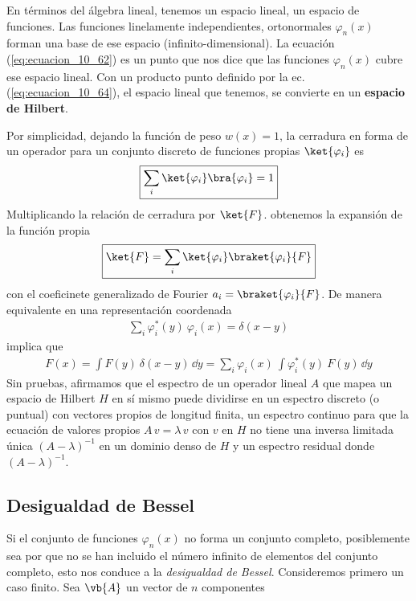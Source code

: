 \par
En términos del álgebra lineal, tenemos un espacio lineal, un espacio de funciones. Las funciones linelamente independientes, ortonormales $\varphi_{n}(x)$ forman una base de ese espacio (infinito-dimensional). La ecuación (\ref{eq:ecuacion_10_62}) es un punto que nos dice que las funciones $\varphi_{n}(x)$ cubre ese espacio lineal. Con un producto punto definido por la ec. (\ref{eq:ecuacion_10_64}), el espacio lineal que tenemos, se convierte en un \textbf{espacio de Hilbert}.
\par
Por simplicidad, dejando la función de peso $w(x)=1$, la cerradura en forma de un operador para un conjunto discreto de funciones propias $\ket{\varphi_{i}}$ es
\begin{align*}
\boxed{\sum_{i} \ket{\varphi_{i}} \bra{\varphi_{i}} =  1}
\end{align*}
Multiplicando la relación de cerradura por $\ket{F}$. obtenemos la expansión de la función propia
\begin{align*}
\boxed{\ket{F} = \sum_{i} \ket{\varphi_{i}} \braket{\varphi_{i}}{F}}
\end{align*}
con el coeficinete generalizado de Fourier $a_{i} = \braket{\varphi_{i}}{F}$. De manera equivalente en una representación coordenada
\begin{align*}
\boxed{\sum_{i} \varphi_{i}^{*} (y) \: \varphi_{i} (x) = \delta (x - y)}
\end{align*}
implica que
\begin{align*}
F(x) = \int F(y) \: \delta (x - y) \, \dd y = \sum_{i} \varphi_{i} (x) \: \int \varphi_{i}^{*} (y) \: F(y) \, \dd y
\end{align*}
Sin pruebas, afirmamos que el espectro de un operador lineal $A$ que mapea un espacio de Hilbert $H$ en sí mismo puede dividirse en un espectro discreto (o puntual) con vectores propios de longitud finita, un espectro continuo para que la ecuación de valores propios $A \, v = \lambda \, v$ con $v$ en $H$ no tiene una inversa limitada única $(A - \lambda)^{-1}$ en un dominio denso de $H$ y un espectro residual donde $(A - \lambda)^{-1}$. \subsection{Desigualdad de Bessel}
Si el conjunto de funciones $\varphi_{n} (x)$ no forma un conjunto completo, posiblemente sea por que no se han incluido el número infinito de elementos del conjunto completo, esto nos conduce a la \emph{desigualdad de Bessel}. Consideremos primero un caso finito. Sea $\vb{A}$ un vector de $n$ componentes
